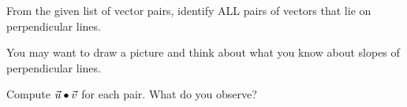 \documentclass{ximera}
\begin{document}
\begin{problem}\label{prob:perpvectors1}
From the given list of vector pairs, identify ALL pairs of vectors that lie on perpendicular lines.
\begin{hint}
You may want to draw a picture and think about what you know about slopes of perpendicular lines.
\end{hint}
\begin{selectAll}
\end{selectAll}
Compute $\vec{u}\bullet\vec{v}$ for each pair.  What do you observe?
\end{problem}
 
\end{document}
